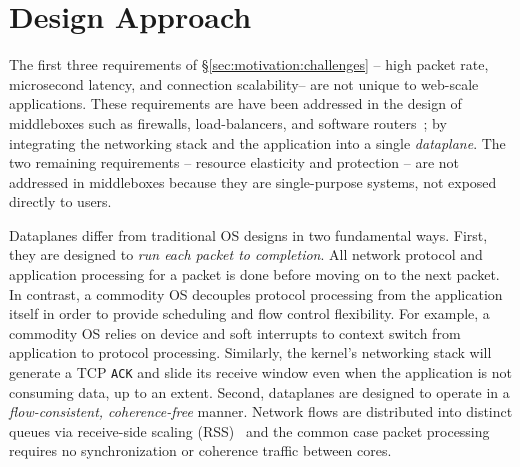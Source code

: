 \section{\ix Design Approach}
\label{sec:design}


The first three requirements of \S\ref{sec:motivation:challenges} --
high packet rate, microsecond latency, and connection scalability--
are not unique to web-scale applications.  These requirements are have
been addressed in the design of middleboxes such as firewalls,
load-balancers, and software
routers~\cite{DBLP:journals/tocs/KohlerMCJK00,DBLP:conf/sosp/DobrescuEACFIKMR09};
by integrating the networking stack and the application into a single
\emph{dataplane}. The two remaining requirements -- resource
elasticity and protection -- are not addressed in middleboxes because
they are single-purpose systems, not exposed directly to users.


Dataplanes differ from traditional OS designs in two fundamental
ways. First, they are designed to \emph{run each packet to
  completion}. All network protocol and application processing for a
packet is done before moving on to the next packet.  In contrast, a
commodity OS decouples protocol processing from the application itself
in order to provide scheduling and flow control flexibility.  For
example, a commodity OS relies on device and soft interrupts to
context switch from application to protocol processing. Similarly, the
kernel's networking stack will generate a TCP \texttt{ACK} and slide
its receive window even when the application is not consuming data, up
to an extent. Second, dataplanes are designed to operate in a
\emph{flow-consistent, coherence-free} manner.  Network flows are
distributed into distinct queues via receive-side scaling
(RSS)~\cite{url:rss} and the common case packet processing requires no
synchronization or coherence traffic between cores.

